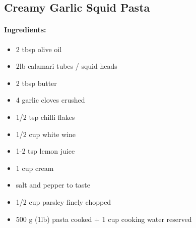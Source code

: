 \documentclass{article}
\begin{document}
\subsection{Creamy Garlic Squid Pasta}

\paragraph{Ingredients:}
\begin{itemize}
    \item 2 tbsp olive oil
    \item 2lb calamari tubes / squid heads
    \item 2 tbsp butter
    \item 4 garlic cloves crushed
    \item 1/2 tsp chilli flakes
    \item 1/2 cup white wine
    \item 1-2 tsp lemon juice
    \item 1 cup cream
    \item salt and pepper to taste
    \item 1/2 cup parsley finely chopped
    \item 500 g (1lb) pasta cooked + 1 cup cooking water reserved
\end{itemize}
\end{document}
